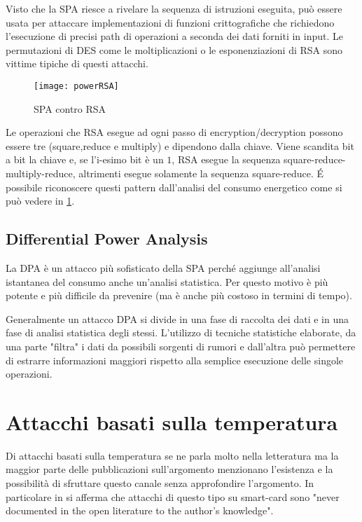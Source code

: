 		Visto che la \ac{SPA} riesce a rivelare la sequenza di istruzioni eseguita, può essere usata per attaccare implementazioni di funzioni crittografiche che richiedono l'esecuzione di precisi path di operazioni a seconda dei dati forniti in input. Le permutazioni di \ac{DES} come le moltiplicazioni o le esponenziazioni di RSA sono vittime tipiche di questi attacchi.
		
		\begin{figure}
			\begin{center}
				\texttt{[image: powerRSA]}
				\caption{SPA contro RSA}
				\label{fig:RSAPower}
			\end{center}
		\end{figure}
	
		Le operazioni che RSA esegue ad ogni passo di encryption/decryption possono essere tre (square,reduce e multiply) e dipendono dalla chiave. Viene scandita bit a bit la chiave e, se l'i-esimo bit è un $1$, RSA esegue la sequenza square-reduce-multiply-reduce, altrimenti esegue solamente la sequenza square-reduce. \'{E} possibile riconoscere questi pattern dall'analisi del consumo energetico come si può vedere in \cref{fig:RSAPower}. 
		
		\subsection{Differential Power Analysis}
			La \ac{DPA} è un attacco più sofisticato della \ac{SPA} perché aggiunge all'analisi istantanea del consumo anche un'analisi statistica. Per questo motivo è più potente e più difficile da prevenire (ma è anche più costoso in termini di tempo).
			
			Generalmente un attacco \ac{DPA} si divide in una fase di raccolta dei dati e in una fase di analisi statistica degli stessi. L'utilizzo di tecniche statistiche elaborate, da una parte "filtra" i dati da possibili sorgenti di rumori e dall'altra può permettere di estrarre informazioni maggiori rispetto alla semplice esecuzione delle singole operazioni. 
	
	\section{Attacchi basati sulla temperatura}
		Di attacchi basati sulla temperatura se ne parla molto nella letteratura\cite{brouchier2009temperature,brouchier2009thermocommunication,skorobogatov2002low} ma la maggior parte delle pubblicazioni sull'argomento menzionano l'esistenza e la possibilità di sfruttare questo canale senza approfondire l'argomento. In particolare in \cite{bar2006sorcerer} si afferma che attacchi di questo tipo su smart-card sono "never documented in the open literature to the author’s knowledge".
		
